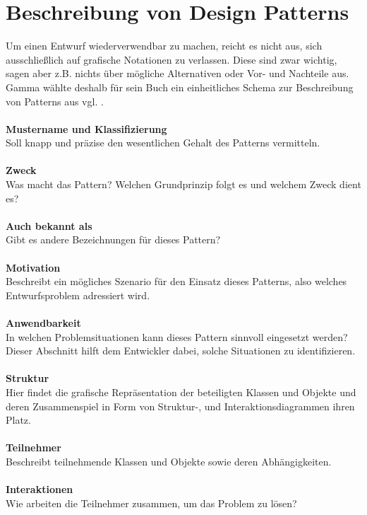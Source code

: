 \documentclass[fontsize=11pt,a4paper,final]{scrreprt}[2003/01/01]
\begin{document}
\section{Beschreibung von Design Patterns}\label{se:Beschreibung von Design Patterns}
Um einen Entwurf wiederverwendbar zu machen, reicht es nicht aus, sich ausschließlich auf grafische Notationen zu verlassen. Diese sind zwar wichtig, sagen aber z.B. nichts über mögliche Alternativen oder Vor- und Nachteile aus. Gamma wählte deshalb für sein Buch ein einheitliches Schema zur Beschreibung von Patterns aus vgl. \cite[S. 8-10]{gamma2004}. \\ \\
\textbf{Mustername und Klassifizierung} \\
Soll knapp und präzise den wesentlichen Gehalt des Patterns vermitteln. \\ \\
\textbf{Zweck} \\
Was macht das Pattern? Welchen Grundprinzip folgt es und welchem Zweck dient es? \\ \\
\textbf{Auch bekannt als} \\
Gibt es andere Bezeichnungen für dieses Pattern? \\ \\
\textbf{Motivation} \\
Beschreibt ein mögliches Szenario für den Einsatz dieses Patterns, also welches Entwurfsproblem adressiert wird. \\ \\
\textbf{Anwendbarkeit} \\
In welchen Problemsituationen kann dieses Pattern sinnvoll eingesetzt werden? Dieser Abschnitt hilft dem Entwickler dabei, solche Situationen zu identifizieren. \\ \\
\textbf{Struktur} \\
Hier findet die grafische Repräsentation der beteiligten Klassen und Objekte und deren Zusammenspiel in Form von Struktur-, und Interaktionsdiagrammen ihren Platz. \\ \\
\textbf{Teilnehmer} \\
Beschreibt teilnehmende Klassen und Objekte sowie deren Abhängigkeiten. \\ \\
\textbf{Interaktionen} \\
Wie arbeiten die Teilnehmer zusammen, um das Problem zu lösen? \\ \\
\end{document}

